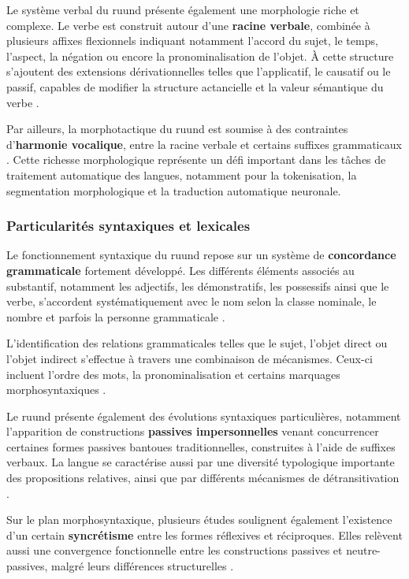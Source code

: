 Le système verbal du ruund présente également une morphologie riche et complexe. Le verbe est construit autour d'une \textbf{racine verbale}, combinée à plusieurs affixes flexionnels indiquant notamment l'accord du sujet, le temps, l'aspect, la négation ou encore la pronominalisation de l'objet. À cette structure s'ajoutent des extensions dérivationnelles telles que l'applicatif, le causatif ou le passif, capables de modifier la structure actancielle et la valeur sémantique du verbe \cite{kasombo2016structure, kawasha2003lunda}.

Par ailleurs, la morphotactique du ruund est soumise à des contraintes d'\textbf{harmonie vocalique}, entre la racine verbale et certains suffixes grammaticaux \cite{kasombo2016structure}. Cette richesse morphologique représente un défi important dans les tâches de traitement automatique des langues, notamment pour la tokenisation, la segmentation morphologique et la traduction automatique neuronale.

\subsubsection{Particularités syntaxiques et lexicales}

Le fonctionnement syntaxique du ruund repose sur un système de \textbf{concordance grammaticale} fortement développé. Les différents éléments associés au substantif, notamment les adjectifs, les démonstratifs, les possessifs ainsi que le verbe, s'accordent systématiquement avec le nom selon la classe nominale, le nombre et parfois la personne grammaticale \cite{kawasha2003lunda}.

L'identification des relations grammaticales telles que le sujet, l'objet direct ou l'objet indirect s'effectue à travers une combinaison de mécanismes. Ceux-ci incluent l'ordre des mots, la pronominalisation et certains marquages morphosyntaxiques \cite{kawasha2003lunda}.

Le ruund présente également des évolutions syntaxiques particulières, notamment l'apparition de constructions \textbf{passives impersonnelles} venant concurrencer certaines formes passives bantoues traditionnelles, construites à l'aide de suffixes verbaux. La langue se caractérise aussi par une diversité typologique importante des propositions relatives, ainsi que par différents mécanismes de détransitivation \cite{kawasha2003lunda}.

Sur le plan morphosyntaxique, plusieurs études soulignent également l'existence d'un certain \textbf{syncrétisme} entre les formes réflexives et réciproques. Elles relèvent aussi une convergence fonctionnelle entre les constructions passives et neutre-passives, malgré leurs différences structurelles \cite{kasombo2016structure, kawasha2003lunda}.

